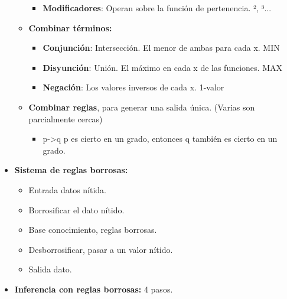 \documentclass[12pt, twoside, openright]{report} %
\begin{document}
\begin{itemize}
\begin{itemize}
\begin{itemize}
      \item \textbf{Modificadores}: Operan sobre la función de pertenencia.
        ², ³...
        
      \end{itemize}
	  \pagebreak
    \item \textbf{Combinar términos:}
      

      \begin{itemize}
      \item \textbf{Conjunción}: Intersección. El menor de ambas para cada
        x. MIN
        
      \item \textbf{Disyunción}: Unión. El máximo en cada x de las
        funciones. MAX
        
      \item \textbf{Negación}: Los valores inversos de cada x. 1-valor
        
      \end{itemize}
    \item \textbf{Combinar reglas}, para generar una salida única. (Varias
      son parcialmente cercas)
      

      \begin{itemize}
      \item p-\textgreater q p es cierto en un grado, entonces q también es
        cierto en un grado.
        
      \end{itemize}
    \end{itemize}
  \item \textbf{Sistema de reglas borrosas:}
    

    \begin{itemize}
    \item Entrada datos nítida.
      
    \item Borrosificar el dato nítido.
      
    \item Base conocimiento, reglas borrosas.
      
    \item Desborrosificar, pasar a un valor nítido.
      
    \item Salida dato.
      
    \end{itemize}
  \item \textbf{Inferencia con reglas borrosas:} 4 pasos.
    


\end{itemize}
\end{document}
